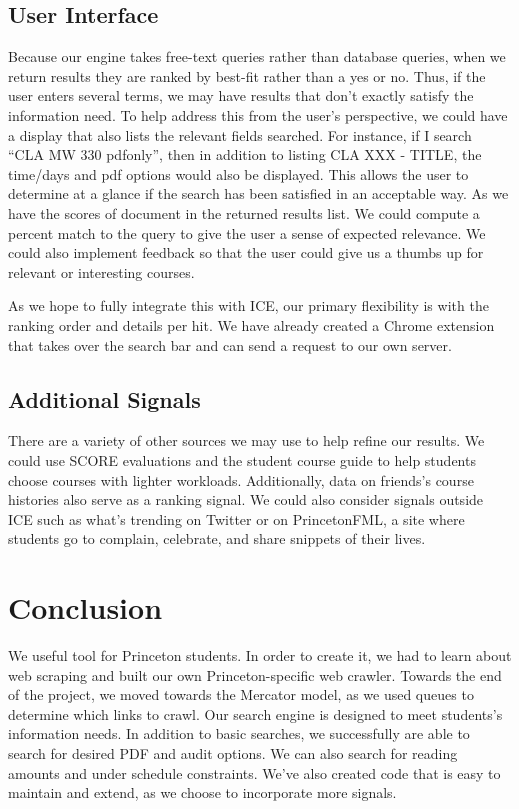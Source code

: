 \documentclass[12pt,letterpaper]{article}
\begin{document}
\subsection{User Interface}
Because our engine takes free-text queries rather than database queries, when we return results they are ranked by best-fit rather than a yes or no. Thus, if the user enters several terms, we may have results that don't exactly satisfy the information need. To help address this from the user's perspective, we could have a display that also lists the relevant fields searched. For instance, if I search ``CLA MW 330 pdfonly'', then in addition to listing CLA XXX - TITLE, the time/days and pdf options would also be displayed. This allows the user to determine at a glance if the search has been satisfied in an acceptable way. 
As we have the scores of document in the returned results list. We could compute a percent match to the query to give the user a sense of expected relevance. We could also implement feedback so that the user could give us a thumbs up for relevant or interesting courses. 

As we hope to fully integrate this with ICE, our primary flexibility is with the ranking order and details per hit. We have already created a Chrome extension that takes over the search bar and can send a request to our own server.  

\subsection{Additional Signals}

There are a variety of other sources we may use to help refine our results. We could use SCORE evaluations and the student course guide to help students choose courses with lighter workloads. Additionally, data on friends's course histories also serve as a ranking signal. We could also consider signals outside ICE such as what's trending on Twitter or on PrincetonFML, a site where students go to complain, celebrate, and share snippets of their lives. 

\section{Conclusion}

We useful tool for Princeton students. In order to create it, we had to learn about web scraping and built our own Princeton-specific web crawler. Towards the end of the project, we moved towards the Mercator model, as we used queues to determine which links to crawl. Our search engine is designed to meet students's information needs. In addition to basic searches, we successfully are able to search for desired PDF and audit options. We can also search for reading amounts and under schedule constraints. We've also created code that is easy to maintain and extend, as we choose to incorporate more signals.
\end{document}
